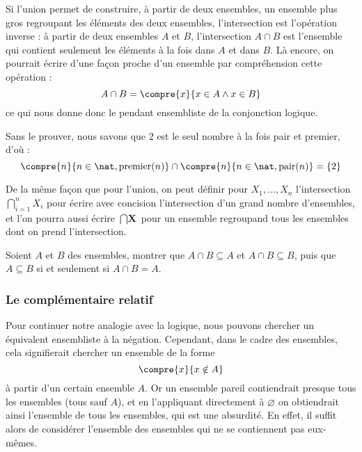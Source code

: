 Si l'union permet de construire, à partir de deux ensembles, un ensemble plus gros regroupant les éléments des deux ensembles, l'intersection est l'opération inverse : à partir de deux ensembles $A$ et $B$, l'intersection $A\cap B$ est l'ensemble qui contient seulement les éléments à la fois dans $A$ et dans $B$. Là encore, on pourrait écrire d'une façon proche d'un ensemble par compréhension cette opération :
$$A\cap B = \compre{x}{x\in A \land x \in B}
$$
ce qui nous donne donc le pendant ensembliste de la conjonction logique.

\begin{expl}
    Sans le prouver, nous savons que $2$ est le seul nombre à la fois pair et premier, d'où : $$\compre{n}{n\in\nat, \mathrm{premier}(n)}\cap\compre{n}{n\in\nat, \mathrm{pair}(n)}=\{2\}$$
\end{expl}


\begin{rmk}
    De la même façon que pour l'union, on peut définir pour $X_1,\ldots,X_n$ l'intersection $\displaystyle{\bigcap_{i=1}^nX_i}$ pour écrire avec concision l'intersection d'un grand nombre d'ensembles, et l'on pourra aussi écrire $\displaystyle{\bigcap \textbf{X}}$ pour un ensemble regroupand tous les ensembles dont on prend l'intersection.
\end{rmk}

\begin{exo}
    Soient $A$ et $B$ des ensembles, montrer que $A\cap B\subseteq A$ et $A\cap B \subseteq B$, puis que $A\subseteq B$ si et seulement si $A\cap B = A$.
\end{exo}

\subsubsection{Le complémentaire relatif}

Pour continuer notre analogie avec la logique, nous pouvons chercher un équivalent ensembliste à la négation. Cependant, dans le cadre des ensembles, cela signifierait chercher un ensemble de la forme $$\compre{x}{x\notin A}$$ à partir d'un certain ensemble $A$. Or un ensemble pareil contiendrait presque tous les ensembles (tous sauf $A$), et en l'appliquant directement à $\varnothing$ on obtiendrait ainsi l'ensemble de tous les ensembles, qui est une absurdité. En effet, il suffit alors de considérer l'ensemble des ensembles qui ne se contiennent pas eux-mêmes.

